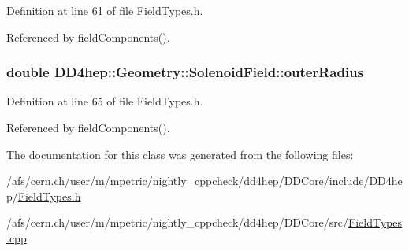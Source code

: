 Definition at line 61 of file FieldTypes.h.

Referenced by fieldComponents().\hypertarget{class_d_d4hep_1_1_geometry_1_1_solenoid_field_a4243bc378c9ad5c7021e9f8525691da9}{
\subsubsection[{outerRadius}]{\setlength{\rightskip}{0pt plus 5cm}double {\bf DD4hep::Geometry::SolenoidField::outerRadius}}}
\label{class_d_d4hep_1_1_geometry_1_1_solenoid_field_a4243bc378c9ad5c7021e9f8525691da9}


Definition at line 65 of file FieldTypes.h.

Referenced by fieldComponents().

The documentation for this class was generated from the following files:\begin{DoxyCompactItemize}
\item 
/afs/cern.ch/user/m/mpetric/nightly\_\-cppcheck/dd4hep/DDCore/include/DD4hep/\hyperlink{_field_types_8h}{FieldTypes.h}\item 
/afs/cern.ch/user/m/mpetric/nightly\_\-cppcheck/dd4hep/DDCore/src/\hyperlink{_field_types_8cpp}{FieldTypes.cpp}\end{DoxyCompactItemize}
